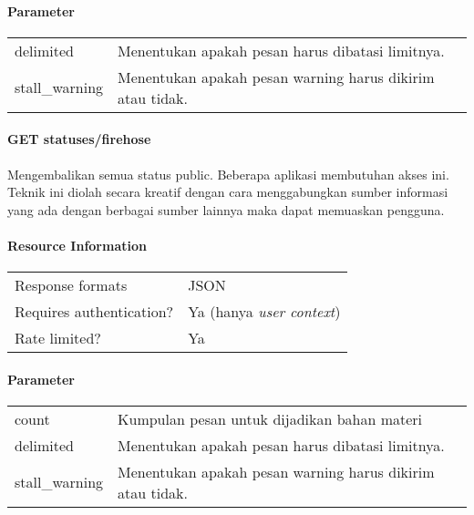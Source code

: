 \paragraph{Parameter}

\begin{table}[h]
\begin{tabular}{ll}
delimited          & Menentukan apakah pesan harus dibatasi limitnya. \\
stall\_warning           & Menentukan apakah pesan warning harus dikirim atau tidak.                \\            
\end{tabular}
\end{table}


\paragraph{GET statuses/firehose}
Mengembalikan semua status public. Beberapa aplikasi membutuhan akses ini. Teknik ini diolah secara kreatif dengan cara menggabungkan sumber informasi yang ada dengan berbagai sumber lainnya maka dapat memuaskan pengguna.

\paragraph{Resource Information}
\begin{table}[h]
\begin{tabular}{|l|l|}
Response formats         & JSON                    \\
Requires authentication? & Ya (hanya \textit{user context}) \\
Rate limited?            & Ya                    
\end{tabular}
\end{table}


\paragraph{Parameter}

\begin{table}[h]
\begin{tabular}{ll}
count & Kumpulan pesan untuk dijadikan bahan materi \\
delimited          & Menentukan apakah pesan harus dibatasi limitnya. \\
stall\_warning           & Menentukan apakah pesan warning harus dikirim atau tidak.                \\            
\end{tabular}
\end{table}


